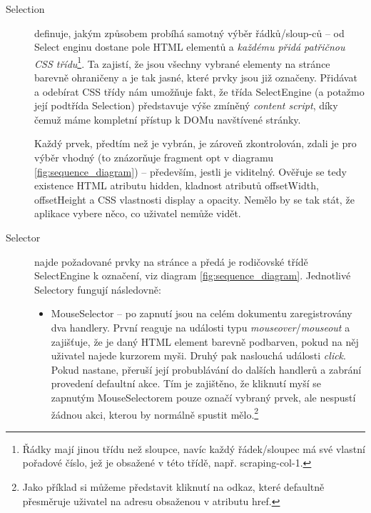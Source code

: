\documentclass[thesis=B,czech]{FITthesis}[2012/06/26]
\begin{document}
\begin{description}
	\item[Selection] definuje, jakým způsobem probíhá samotný výběr řádků/sloup-ců -- od Select enginu dostane pole HTML elementů a \emph{každému přidá patřičnou CSS třídu}\footnote{Řádky mají jinou třídu než sloupce, navíc každý řádek/sloupec má své vlastní pořadové číslo, jež je obsažené v této třídě, např. \textsf{scraping-col-1}.}. Ta zajistí, že jsou všechny vybrané elementy na stránce barevně ohraničeny a je tak jasné, které prvky jsou již označeny. Přidávat a odebírat CSS třídy nám umožňuje fakt, že třída SelectEngine (a potažmo její podtřída Selection) představuje výše zmíněný \emph{content script}, díky čemuž máme kompletní přístup k DOMu navštívené stránky.
	
	Každý prvek, předtím než je vybrán, je zároveň zkontrolován, zdali je pro výběr vhodný (to znázorňuje fragment \textsf{opt} v diagramu \ref{fig:sequence_diagram}) -- především, jestli je viditelný. Ověřuje se tedy existence HTML atributu \textsf{hidden}, kladnost atributů \textsf{offsetWidth, offsetHeight} a CSS vlastnosti \textsf{display} a \textsf{opacity}. Nemělo by se tak stát, že aplikace vybere něco, co uživatel nemůže vidět.
	
	\item[Selector] najde požadované prvky na stránce a předá je rodičovské třídě SelectEngine k označení, viz diagram \ref{fig:sequence_diagram}. Jednotlivé Selectory fungují následovně:
	\begin{itemize}
		\item MouseSelector -- po zapnutí jsou na celém dokumentu zaregistrovány dva handlery. První reaguje na události typu \emph{mouseover}/\emph{mouseout} a zajišťuje, že je daný HTML element barevně podbarven, pokud na něj uživatel najede kurzorem myši. Druhý pak naslouchá události \emph{click}. Pokud nastane, přeruší její probublávání do dalších handlerů a zabrání provedení defaultní akce. Tím je zajištěno, že kliknutí myší se zapnutým MouseSelectorem pouze označí vybraný prvek, ale nespustí žádnou akci, kterou by normálně spustit mělo.\footnote{Jako příklad si můžeme představit kliknutí na odkaz, které defaultně přesměruje uživatel na adresu obsaženou v atributu \textsf{href}.}
		

\end{itemize}
\end{description}
\end{document}
